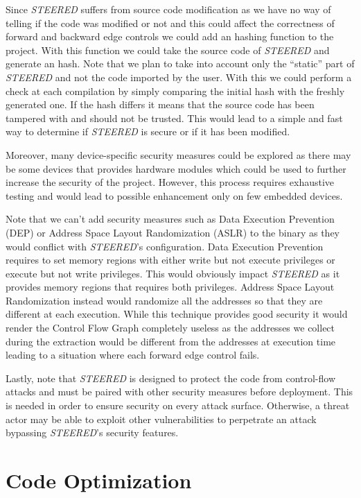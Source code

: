 Since \textit{STEERED} suffers from source code modification as we have no way of
telling if the code was modified or not and this could affect the correctness of
forward and backward edge controls we could add an hashing function to the project.
With this function we could take the source code of \textit{STEERED} and generate
an hash. Note that we plan to take into account only the ``static'' part of
\textit{STEERED} and not the code imported by the user. With this we could
perform a check at each compilation by simply comparing the initial hash with
the freshly generated one. If the hash differs it means that the source code has
been tampered with and should not be trusted. This would lead to a simple and
fast way to determine if \textit{STEERED} is secure or if it has been modified.

Moreover, many device-specific security measures could be explored as there may
be some devices that provides hardware modules which could be used to further
increase the security of the project. However, this process requires exhaustive
testing and would lead to possible enhancement only on few embedded devices.

Note that we can't add security measures such as Data Execution Prevention (DEP)
or Address Space Layout Randomization (ASLR) to the binary as they would
conflict with \textit{STEERED}'s configuration. Data Execution Prevention
requires to set memory regions with either write but not execute privileges or
execute but not write privileges. This would obviously impact \textit{STEERED}
as it provides memory regions that requires both privileges. Address Space Layout
Randomization instead would randomize all the addresses so that they are different
at each execution. While this technique provides good security it would render
the Control Flow Graph completely useless as the addresses we collect during the
extraction would be different from the addresses at execution time leading to a
situation where each forward edge control fails.

Lastly, note that \textit{STEERED} is designed to protect the code from control-flow
attacks and must be paired with other security measures before deployment. This is
needed in order to ensure security on every attack surface. Otherwise, a threat actor
may be able to exploit other vulnerabilities to perpetrate an attack bypassing \textit{STEERED}'s
security features.

\section{Code Optimization}
\label{sec:future_optimization}

